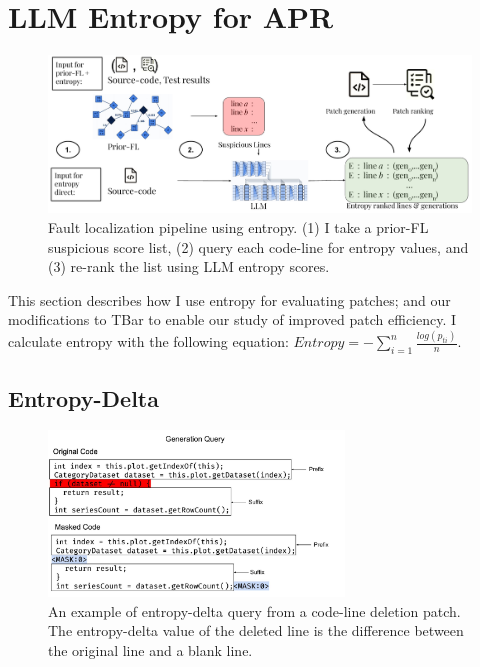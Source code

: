 \documentclass[12pt,openany,oneside,table]{cmuthesis}
\begin{document}
\section{LLM Entropy for APR}
\begin{figure}[t]
\centering
\includegraphics[width=\textwidth]{figures/approach/entropy_approach.pdf}
\caption{Fault localization pipeline using entropy. (1) I take a prior-FL suspicious score list, (2) query each code-line for entropy values, and (3) re-rank the list using LLM entropy scores.}
\label{fig:fl-method}
\end{figure}


This section describes how I use entropy for evaluating patches; and our modifications to TBar to enable our
 study of improved patch efficiency.
I calculate entropy with the following equation:
$Entropy = -\sum_{i=1}^{n}\frac{log(p_{ti})}{n}$.

\subsection{Entropy-Delta}
\label{sec:entropy-delta}
\begin{figure}
\includegraphics[width=0.7\textwidth]{figures/approach/generation_query.pdf}
\caption{An example of entropy-delta query from a code-line deletion patch. The entropy-delta value of the deleted line is the difference between the original line and a blank line.}
\label{fig:deletion-method}
\end{figure}
\end{document}
